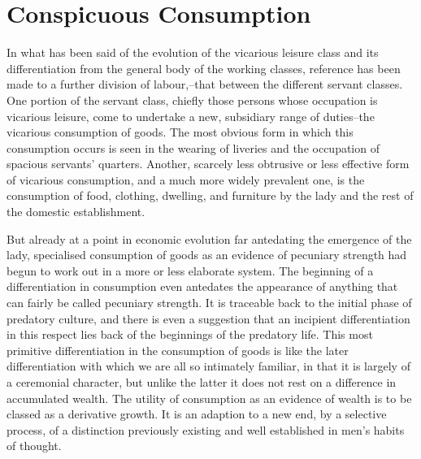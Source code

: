 \documentclass[12pt]{report}
\begin{document}
\chapter{Conspicuous Consumption}

In what has been said of the evolution of the vicarious leisure class
and its differentiation from the general body of the working classes,
reference has been made to a further division of labour,--that between
the different servant classes. One portion of the servant class, chiefly
those persons whose occupation is vicarious leisure, come to undertake a
new, subsidiary range of duties--the vicarious consumption of goods.
The most obvious form in which this consumption occurs is seen in the
wearing of liveries and the occupation of spacious servants' quarters.
Another, scarcely less obtrusive or less effective form of vicarious
consumption, and a much more widely prevalent one, is the consumption of
food, clothing, dwelling, and furniture by the lady and the rest of the
domestic establishment.

But already at a point in economic evolution far antedating the
emergence of the lady, specialised consumption of goods as an evidence
of pecuniary strength had begun to work out in a more or less elaborate
system. The beginning of a differentiation in consumption even antedates
the appearance of anything that can fairly be called pecuniary strength.
It is traceable back to the initial phase of predatory culture, and
there is even a suggestion that an incipient differentiation in this
respect lies back of the beginnings of the predatory life. This most
primitive differentiation in the consumption of goods is like the later
differentiation with which we are all so intimately familiar, in that it
is largely of a ceremonial character, but unlike the latter it does not
rest on a difference in accumulated wealth. The utility of consumption
as an evidence of wealth is to be classed as a derivative growth. It
is an adaption to a new end, by a selective process, of a distinction
previously existing and well established in men's habits of thought.
\end{document}

